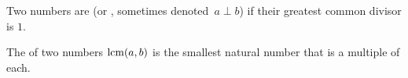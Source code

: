 \documentclass{ibl}  %
\begin{document}
\begin{problem}

\end{problem}

\begin{df}
Two numbers are  
(or , sometimes denoted~$a\perp b$) if their 
greatest common divisor is $1$.
\end{df}

\begin{df}
The  of two numbers $\operatorname{lcm}(a,b)$ 
is the smallest natural number that is a multiple of each.
\end{df}
\end{document}
